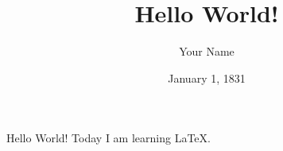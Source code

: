 \documentclass{article}
\title{Hello World!}
\author{Your Name}
\date{January 1, 1831}
\begin{document}
    \maketitle

Hello World! Today I am learning \LaTeX.
\end{document}
